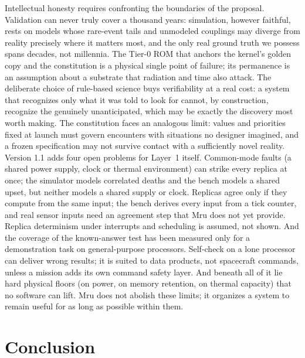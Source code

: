 \documentclass[10pt, a4paper]{article}
\begin{document}
Intellectual honesty requires confronting the boundaries of the proposal. Validation can never truly cover a thousand years: simulation, however faithful, rests on models whose rare-event tails and unmodeled couplings may diverge from reality precisely where it matters most, and the only real ground truth we possess spans decades, not millennia. The Tier-0 ROM that anchors the kernel's golden copy and the constitution is a physical single point of failure; its permanence is an assumption about a substrate that radiation and time also attack. The deliberate choice of rule-based science buys verifiability at a real cost: a system that recognizes only what it was told to look for cannot, by construction, recognize the genuinely unanticipated, which may be exactly the discovery most worth making. The constitution faces an analogous limit: values and priorities fixed at launch must govern encounters with situations no designer imagined, and a frozen specification may not survive contact with a sufficiently novel reality. Version 1.1 adds four open problems for Layer~1 itself. Common-mode faults (a shared power supply, clock or thermal environment) can strike every replica at once; the simulator models correlated deaths and the bench models a shared upset, but neither models a shared supply or clock. Replicas agree only if they compute from the same input; the bench derives every input from a tick counter, and real sensor inputs need an agreement step that Mru does not yet provide. Replica determinism under interrupts and scheduling is assumed, not shown. And the coverage of the known-answer test has been measured only for a demonstration task on general-purpose processors. Self-check on a lone processor can deliver wrong results; it is suited to data products, not spacecraft commands, unless a mission adds its own command safety layer. And beneath all of it lie hard physical floors (on power, on memory retention, on thermal capacity) that no software can lift. Mru does not abolish these limits; it organizes a system to remain useful for as long as possible within them.

\section{Conclusion}
\end{document}

